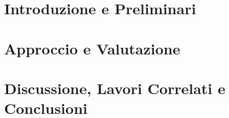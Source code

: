 
\listoffigures


\listoftables


\lstlistoflistings




\mainmatter

\part{Introduzione e Preliminari}

	

	

\part{Approccio e Valutazione}

	

	

\part{Discussione, Lavori Correlati e Conclusioni}

